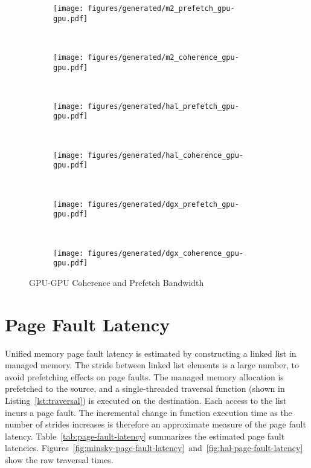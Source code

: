 \begin{figure}[ht]
    \centering
    \begin{subfigure}[b]{0.45\textwidth}
        \texttt{[image: figures/generated/m2\_prefetch\_gpu-gpu.pdf]}
        \caption{}
        \label{fig:um-prefetch-s822lc-gpu-gpu}
    \end{subfigure}
    ~
    \begin{subfigure}[b]{0.45\textwidth}
        \texttt{[image: figures/generated/m2\_coherence\_gpu-gpu.pdf]}
        \caption{}
        \label{fig:um-coherence-s822lc-gpu-gpu}
    \end{subfigure}
    \\
    \begin{subfigure}[b]{0.45\textwidth}
        \texttt{[image: figures/generated/hal\_prefetch\_gpu-gpu.pdf]}
        \caption{}
        \label{fig:um-prefetch-ac922-gpu-gpu}
    \end{subfigure}
    ~
    \begin{subfigure}[b]{0.45\textwidth}
        \texttt{[image: figures/generated/hal\_coherence\_gpu-gpu.pdf]}
        \caption{}
        \label{fig:um-coherence-ac922-gpu-gpu}
    \end{subfigure}
    \\
    \begin{subfigure}[b]{0.45\textwidth}
        \texttt{[image: figures/generated/dgx\_prefetch\_gpu-gpu.pdf]}
        \caption{}
        \label{fig:um-prefetch-dgx-gpu-gpu}
    \end{subfigure}
    ~
    \begin{subfigure}[b]{0.45\textwidth}
        \texttt{[image: figures/generated/dgx\_coherence\_gpu-gpu.pdf]}
        \caption{}
        \label{fig:um-coherence-dgx-gpu-gpu}
    \end{subfigure}
    \caption[]{
        GPU-GPU Coherence and Prefetch Bandwidth
    }
    \label{fig:um-coherence-gpu-gpu}
\end{figure}




\section{Page Fault Latency}

Unified memory page fault latency is estimated by constructing a linked list in managed memory.
The stride between linked list elements is a large number, to avoid prefetching effects on page faults.
The managed memory allocation is prefetched to the source, and a single-threaded traversal function (shown in Listing~\ref{lst:traversal}) is executed on the destination.
Each access to the list incurs a page fault.
The incremental change in function execution time as the number of strides increases is therefore an approximate measure of the page fault latency.
Table~\ref{tab:page-fault-latency} summarizes the estimated page fault latencies.
Figures~\ref{fig:minsky-page-fault-latency}~and~\ref{fig:hal-page-fault-latency} show the raw traversal times.

